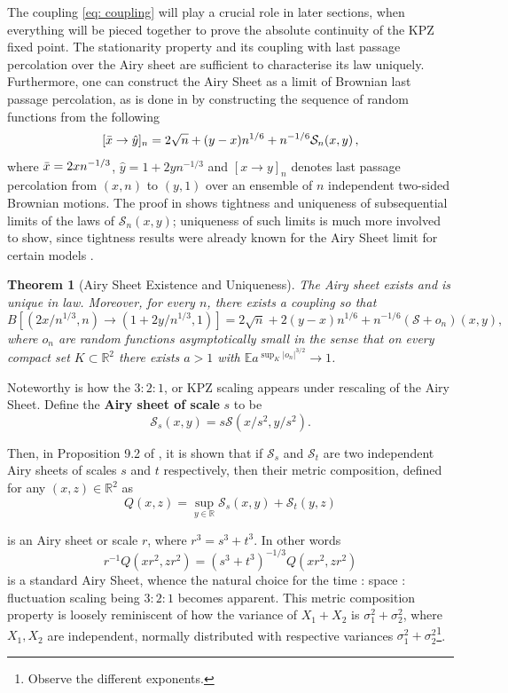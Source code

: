 \documentclass[12pt]{report}
\theoremstyle{plain}
\newtheorem{theorem}{Theorem}[section]
\newcommand{\R}{\ensuremath{\mathbb{R}}}
\begin{document}
The coupling \ref{eq: coupling} will play a crucial role in later sections, when everything will be pieced together to prove the absolute continuity of the KPZ fixed point. The stationarity property and its coupling with last passage percolation over the Airy sheet are sufficient to characterise its law uniquely. Furthermore, one can construct the Airy Sheet as a limit of Brownian last passage percolation, as is done in \cite{DOV} by constructing the sequence of random functions from the following
\[
[\Bar{x}\to \hat{y}]_n = 2\sqrt{n}+(y-x)n^{1/6}+n^{-1/6}\mathcal{S}_n(x,y)\,,
\]  
\noindent where \(\Bar{x} = 2xn^{-1/3}\), \(\hat{y} = 1+2yn^{-1/3}\) and \([x \to y]_n\) denotes last passage percolation from \((x,n)\) to \((y,1)\) over an ensemble of \(n\) independent two-sided Brownian motions. The proof in \cite{DOV} shows tightness and uniqueness of subsequential limits of the laws of \(\mathcal{S}_n(x,y)\); uniqueness of such limits is much more involved to show, since tightness results were already known for the Airy Sheet limit for certain models \cite{pr2018local}. 

\begin{theorem}[Airy Sheet Existence and Uniqueness]\label{thm: Airy Sheet}
	\label{T:intro-sheet}
	The Airy sheet exists and is unique in law. Moreover, for every \(n\), there exists a coupling so that
	\[
	B[(2x/n^{1/3},n) \to (1+2y/n^{1/3},1)] = 2\sqrt{n} + 2(y - x)n^{1/6} + n^{-1/6} (\mathcal{S}+o_n)(x,y),
	\]
	where \(o_n\) are random functions asymptotically small in the sense that on every compact set \(K\subset \R^2\) there exists \(a>1\) with
	\(\mathbb{E} a^{\sup_K |o_n|^{3/2}}\to 1\).
\end{theorem}

Noteworthy is how the \(3:2:1\), or KPZ scaling appears under rescaling of the Airy Sheet. Define the \textbf{Airy sheet of scale} \(s\) to be 
\[
\mathcal{S}_{s}(x,y) = s\mathcal{S}(x/s^2, y/s^2).
\]

\noindent Then, in Proposition 9.2 of \cite{DOV}, it is shown that if \(\mathcal{S}_s\) and \(\mathcal{S}_t\) are two independent Airy sheets of scales \(s\) and \(t\) respectively, then their metric composition, defined for any \((x,z)\in \R^2\) as 
\begin{equation}\label{eq: metric Airy}
    Q(x,z) = \sup_{y\in\R}\mathcal{S}_s(x,y)+\mathcal{S}_t(y,z)
\end{equation}

\noindent is an Airy sheet or scale \(r\), where \(r^3 = s^3+t^3\). In other words
\[
r^{-1}Q(xr^2,zr^2) = (s^3+t^3)^{-1/3}Q(xr^2,zr^2)
\]
\noindent is a standard Airy Sheet, whence the natural choice for the time : space : fluctuation scaling being \(3:2:1\) becomes apparent. This metric composition property is loosely reminiscent of how the variance of \(X_1 + X_2\) is \(\sigma_1^2+\sigma_2^2\), where \(X_1,X_2\) are independent, normally distributed with respective variances \(\sigma_1^2+\sigma_2^2\)\footnote{Observe the different exponents.}. 
\end{document}
